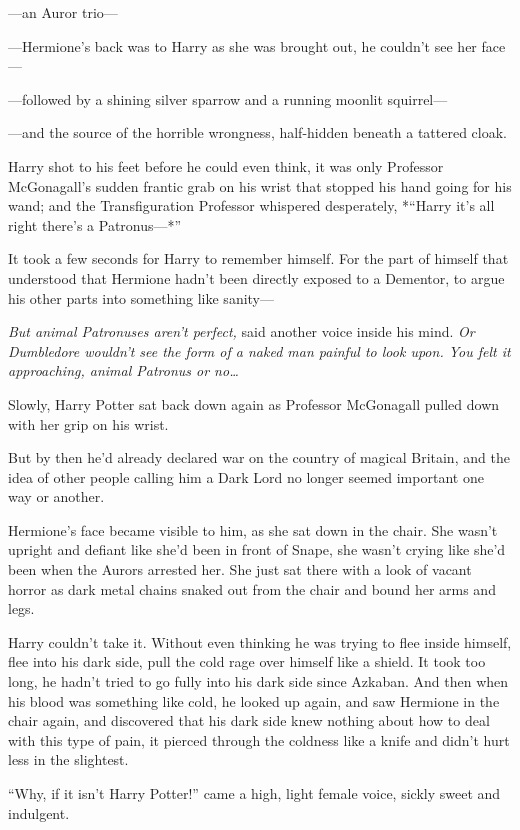 ---an Auror trio---

---Hermione's back was to Harry as she was brought out, he couldn't see
her face---

---followed by a shining silver sparrow and a running moonlit
squirrel---

---and the source of the horrible wrongness, half-hidden beneath a
tattered cloak.

Harry shot to his feet before he could even think, it was only Professor
McGonagall's sudden frantic grab on his wrist that stopped his hand
going for his wand; and the Transfiguration Professor whispered
desperately, *``Harry it's all right there's a Patronus---*''

It took a few seconds for Harry to remember himself. For the part of
himself that understood that Hermione hadn't been directly exposed to a
Dementor, to argue his other parts into something like sanity---

\emph{But animal Patronuses aren't perfect,} said another voice inside
his mind. \emph{Or Dumbledore wouldn't see the form of a naked man
painful to look upon. You felt it approaching, animal Patronus or
no\ldots{}}

Slowly, Harry Potter sat back down again as Professor McGonagall pulled
down with her grip on his wrist.

But by then he'd already declared war on the country of magical Britain,
and the idea of other people calling him a Dark Lord no longer seemed
important one way or another.

Hermione's face became visible to him, as she sat down in the chair. She
wasn't upright and defiant like she'd been in front of Snape, she wasn't
crying like she'd been when the Aurors arrested her. She just sat there
with a look of vacant horror as dark metal chains snaked out from the
chair and bound her arms and legs.

Harry couldn't take it. Without even thinking he was trying to flee
inside himself, flee into his dark side, pull the cold rage over himself
like a shield. It took too long, he hadn't tried to go fully into his
dark side since Azkaban. And then when his blood was something like
cold, he looked up again, and saw Hermione in the chair again, and
discovered that his dark side knew nothing about how to deal with this
type of pain, it pierced through the coldness like a knife and didn't
hurt less in the slightest.

``Why, if it isn't Harry Potter!'' came a high, light female voice,
sickly sweet and indulgent.

